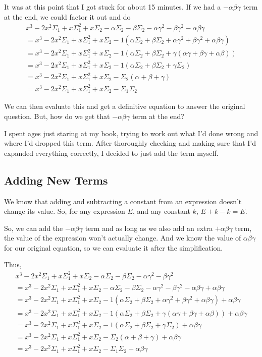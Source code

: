 \documentclass[a4paper]{article}
\newcommand{\ab}{\alpha\beta}
\newcommand{\bg}{\beta\gamma}
\newcommand{\ag}{\alpha\gamma}
\newcommand{\abg}{\alpha\beta\gamma}
\newcommand{\Sone}{\Sigma_1}
\newcommand{\Stwo}{\Sigma_2}
\begin{document}
It was at this point that I got stuck for about 15 minutes. If we had a $-\abg$ term at the end, we could factor it out and do
\begin{gather*}
x^3 - 2x^2\Sone + x\Sone^2 + x\Stwo - \alpha\Stwo - \beta\Stwo - \ag^2 - \bg^2 - \abg\\[0.5em]
= x^3 - 2x^2\Sone + x\Sone^2 + x\Stwo -1(\alpha\Stwo + \beta\Stwo + \ag^2 + \bg^2 + \abg)\\[0.5em]
= x^3 - 2x^2\Sone + x\Sone^2 + x\Stwo -1(\alpha\Stwo + \beta\Stwo + \gamma(\ag + \bg + \ab))\\[0.5em]
= x^3 - 2x^2\Sone + x\Sone^2 + x\Stwo -1(\alpha\Stwo + \beta\Stwo + \gamma\Stwo)\\[0.5em]
= x^3 - 2x^2\Sone + x\Sone^2 + x\Stwo -\Stwo(\alpha + \beta + \gamma)\\[0.5em]
= x^3 - 2x^2\Sone + x\Sone^2 + x\Stwo - \Sone\Stwo
\end{gather*}

We can then evaluate this and get a definitive equation to answer the original question. But, how do we get that $- \abg$ term at the end?

I spent ages just staring at my book, trying to work out what I'd done wrong and where I'd dropped this term. After thoroughly checking and making sure that I'd expanded everything correctly, I decided to just add the term myself.

\subsection{Adding New Terms}

We know that adding and subtracting a constant from an expression doesn't change its value. So, for any expression $E$, and any constant $k$, $E + k - k = E$.

So, we can add the $-\abg$ term and as long as we also add an extra $+\abg$ term, the value of the expression won't actually change. And we know the value of $\abg$ for our original equation, so we can evaluate it after the simplification.

Thus,
\begin{gather*}
x^3 - 2x^2\Sone + x\Sone^2 + x\Stwo - \alpha\Stwo - \beta\Stwo - \ag^2 - \bg^2\\[0.5em]
= x^3 - 2x^2\Sone + x\Sone^2 + x\Stwo - \alpha\Stwo - \beta\Stwo - \ag^2 - \bg^2 - \abg + \abg\\[0.5em]
= x^3 - 2x^2\Sone + x\Sone^2 + x\Stwo -1(\alpha\Stwo + \beta\Stwo + \ag^2 + \bg^2 + \abg) + \abg\\[0.5em]
= x^3 - 2x^2\Sone + x\Sone^2 + x\Stwo -1(\alpha\Stwo + \beta\Stwo + \gamma(\ag + \bg + \ab)) + \abg\\[0.5em]
= x^3 - 2x^2\Sone + x\Sone^2 + x\Stwo -1(\alpha\Stwo + \beta\Stwo + \gamma\Stwo) + \abg\\[0.5em]
= x^3 - 2x^2\Sone + x\Sone^2 + x\Stwo -\Stwo(\alpha + \beta + \gamma) + \abg\\[0.5em]
= x^3 - 2x^2\Sone + x\Sone^2 + x\Stwo - \Sone\Stwo + \abg
\end{gather*}
\end{document}
